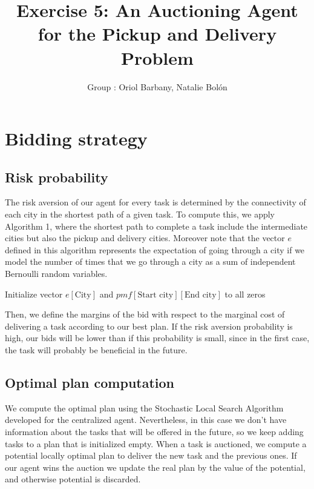 \documentclass[11pt]{article}
\title{\bf Exercise 5: An Auctioning Agent for the Pickup and Delivery Problem}
\author{Group \textnumero 54: Oriol Barbany, Natalie Bolón}
\begin{document}
\maketitle

\section{Bidding strategy}
\subsection{Risk probability}
The risk aversion of our agent for every task is determined by the connectivity of each city in the shortest path of a given task. To compute this, we apply Algorithm 1, where the shortest path to complete a task include the intermediate cities but also the pickup and delivery cities. Moreover note that the vector $e$ defined in this algorithm represents the expectation of going through a city if we model the number of times that we go through a city as a sum of independent Bernoulli random variables.

\begin{algorithm}[H]
\SetAlgoLined
{}
Initialize vector $e[\text{City}]$ and $pmf[\text{Start city}][\text{End city}]$ to all zeros

 \caption{}
\end{algorithm}

Then, we define the margins of the bid with respect to the marginal cost of delivering a task according to our best plan. If the risk aversion probability is high, our bids will be lower than if this probability is small, since in the first case, the task will probably be beneficial in the future.

\subsection{Optimal plan computation}
We compute the optimal plan using the Stochastic Local Search Algorithm developed for the centralized agent. Nevertheless, in this case we don't have information about the tasks that will be offered in the future, so we keep adding tasks to a plan that is initialized empty. When a task is auctioned, we compute a potential locally optimal plan to deliver the new task and the previous ones. If our agent wins the auction we update the real plan by the value of the potential, and otherwise potential is discarded.
\end{document}
